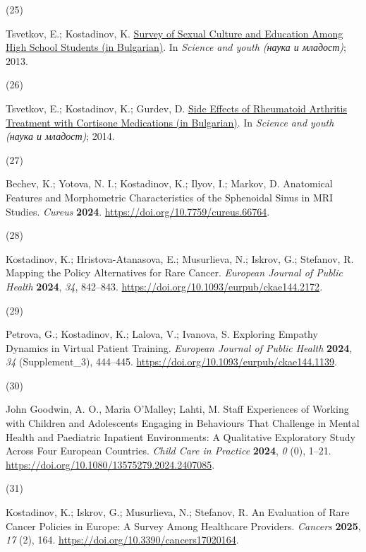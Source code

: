 \documentclass[
  12pt,
  letterpaper,
  DIV=11,
  numbers=noendperiod]{scrartcl}
\newlength{\cslhangindent}
\newlength{\csllabelwidth}
\newenvironment{CSLReferences}[2] %
 {\begin{list}{}{%
  \setlength{\itemindent}{0pt}
  \setlength{\leftmargin}{0pt}
  \setlength{\parsep}{0pt}
  \ifodd #1
   \setlength{\leftmargin}{\cslhangindent}
   \setlength{\itemindent}{-1\cslhangindent}
  \fi
  \setlength{\itemsep}{#2\baselineskip}}}
 {\end{list}}
\newcommand{\CSLLeftMargin}[1]{\parbox[t]{\csllabelwidth}{\strut#1\strut}}
\newcommand{\CSLRightInline}[1]{\parbox[t]{\linewidth - \csllabelwidth}{\strut#1\strut}}
\begin{document}
\begin{CSLReferences}{0}{0}
\CSLLeftMargin{(25) }%
\CSLRightInline{Tsvetkov, E.; Kostadinov, K.
\href{https://asclepius.bg/cnm/wp-content/uploads/2022/05/mnd_2013.pdf}{Survey
of Sexual Culture and Education Among High School Students (in
Bulgarian)}. In \emph{Science and youth (наука и младост)}; 2013.}

\CSLLeftMargin{(26) }%
\CSLRightInline{Tsvetkov, E.; Kostadinov, K.; Gurdev, D.
\href{https://asclepius.bg/cnm/wp-content/uploads/2022/05/sbornik-2014.pdf}{Side
Effects of Rheumatoid Arthritis Treatment with Cortisone Medications (in
Bulgarian)}. In \emph{Science and youth (наука и младост)}; 2014.}

\CSLLeftMargin{(27) }%
\CSLRightInline{Bechev, K.; Yotova, N. I.; Kostadinov, K.; Ilyov, I.;
Markov, D. Anatomical Features and Morphometric Characteristics of the
Sphenoidal Sinus in MRI Studies. \emph{Cureus} \textbf{2024}.
\url{https://doi.org/10.7759/cureus.66764}.}

\CSLLeftMargin{(28) }%
\CSLRightInline{Kostadinov, K.; Hristova-Atanasova, E.; Musurlieva, N.;
Iskrov, G.; Stefanov, R. Mapping the Policy Alternatives for Rare
Cancer. \emph{European Journal of Public Health} \textbf{2024},
\emph{34}, 842--843. \url{https://doi.org/10.1093/eurpub/ckae144.2172}.}

\CSLLeftMargin{(29) }%
\CSLRightInline{Petrova, G.; Kostadinov, K.; Lalova, V.; Ivanova, S.
Exploring Empathy Dynamics in Virtual Patient Training. \emph{European
Journal of Public Health} \textbf{2024}, \emph{34} (Supplement\_3),
444--445. \url{https://doi.org/10.1093/eurpub/ckae144.1139}.}

\CSLLeftMargin{(30) }%
\CSLRightInline{John Goodwin, A. O., Maria O'Malley; Lahti, M. Staff
Experiences of Working with Children and Adolescents Engaging in
Behaviours That Challenge in Mental Health and Paediatric Inpatient
Environments: A Qualitative Exploratory Study Across Four European
Countries. \emph{Child Care in Practice} \textbf{2024}, \emph{0} (0),
1--21. \url{https://doi.org/10.1080/13575279.2024.2407085}.}

\CSLLeftMargin{(31) }%
\CSLRightInline{Kostadinov, K.; Iskrov, G.; Musurlieva, N.; Stefanov, R.
An Evaluation of Rare Cancer Policies in Europe: A Survey Among
Healthcare Providers. \emph{Cancers} \textbf{2025}, \emph{17} (2), 164.
\url{https://doi.org/10.3390/cancers17020164}.}


\end{CSLReferences}
\end{document}
